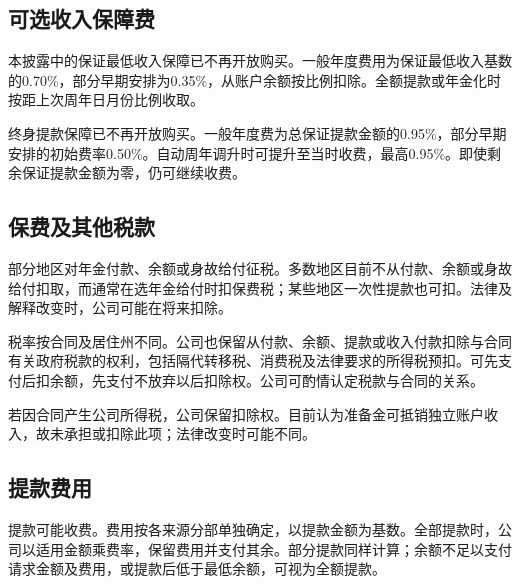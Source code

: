 \documentclass[UTF8,fontset=none,11pt,a4paper]{ctexart}
\begin{document}
\subsection*{可选收入保障费}
本披露中的保证最低收入保障已不再开放购买。一般年度费用为保证最低收入基数的0.70\%，部分早期安排为0.35\%，从账户余额按比例扣除。全额提款或年金化时按距上次周年日月份\allowbreak\mbox{比例收取。}


终身提款保障已不再开放购买。一般年度费为总保证提款金额的0.95\%，部分早期安排的初始费率0.50\%。自动周年调升时可提升至当时收费，最高0.95\%。即使剩余保证提款金额为零，仍可\allowbreak\mbox{继续收费。}


\subsection*{保费及其他税款}
部分地区对年金付款、余额或身故给付征税。多数地区目前不从付款、余额或身故给付扣取，而通常在选年金给付时扣保费税；某些地区一次性提款也可扣。法律及解释改变时，公司可能在\allowbreak\mbox{将来扣除。}


税率按合同及居住州不同。公司也保留从付款、余额、提款或收入付款扣除与合同有关政府税款的权利，包括隔代转移税、消费税及法律要求的所得税预扣。可先支付后扣余额，先支付不放弃以后扣除权。公司可酌情认定税款与合\allowbreak\mbox{同的关系。}


若因合同产生公司所得税，公司保留扣除权。目前认为准备金可抵销独立账户收入，故未承担或扣除此项；法律改变时\allowbreak\mbox{可能不同。}


\subsection*{提款费用}
提款可能收费。费用按各来源分部单独确定，以提款金额为基数。全部提款时，公司以适用金额乘费率，保留费用并支付其余。部分提款同样计算；余额不足以支付请求金额及费用，或提款后低于最低余额，可视为\allowbreak\mbox{全额提款。}
\end{document}
